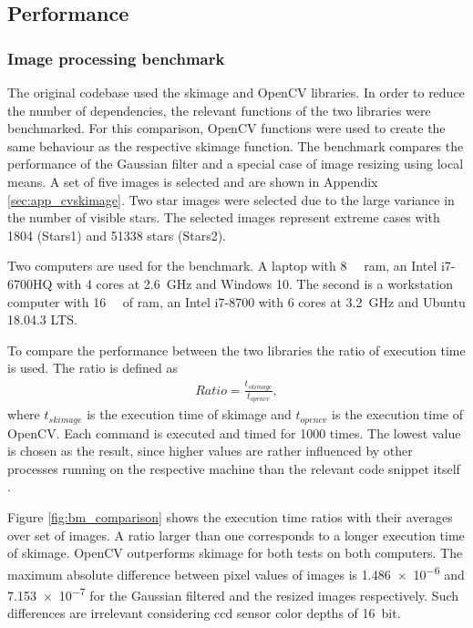 \subsection{Performance}
\subsubsection{Image processing benchmark} \label{sec:cvskimage}
The original codebase used the \gls{skimage} and OpenCV libraries. In order to reduce the number of dependencies, the relevant functions of the two libraries were benchmarked. For this comparison, OpenCV functions were used to create the same behaviour as the respective \gls{skimage} function. The benchmark compares the performance of the Gaussian filter and a special case of image resizing using local means. A set of five images is selected and are shown in Appendix \ref{sec:app_cvskimage}. Two star images were selected due to the large variance in the number of visible stars. The selected images represent extreme cases with 1804 (Stars1) and 51338 stars (Stars2).

Two computers are used for the benchmark. A laptop with \SI{8}{\giga\byte} \gls{ram}, an Intel i7-6700HQ with 4 cores at \SI{2.6}{\giga\hertz} and Windows 10. The second is a workstation computer with \SI{16}{\giga\byte} of \gls{ram}, an Intel i7-8700 with 6 cores at \SI{3.2}{\giga\hertz} and Ubuntu 18.04.3 LTS.

To compare the performance between the two libraries the ratio of execution time is used. The ratio is defined as
\begin{align}
    Ratio = \frac{t_{skimage}}{t_{opencv}}, \label{eq:bm_exec_ratio}
\end{align}
where $t_{skimage}$ is the execution time of \gls{skimage} and $t_{opencv}$ is the execution time of OpenCV. Each command is executed and timed for 1000 times. The lowest value is chosen as the result, since higher values are rather influenced by other processes running on the respective machine than the relevant code snippet itself \cite{timeit2020}.

Figure \ref{fig:bm_comparison} shows the execution time ratios with their averages over set of images. A ratio larger than one corresponds to a longer execution time of \gls{skimage}. OpenCV outperforms \gls{skimage} for both tests on both computers. The maximum absolute difference between pixel values of images is \SI{1.486e-6}{} and \SI{7.153e-7}{} for the Gaussian filtered and the resized images respectively. Such differences are irrelevant considering \gls{ccd} sensor color depths of \SI{16}{bit}.


